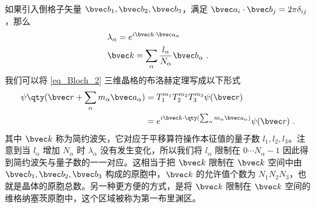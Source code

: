 如果引入倒格子矢量 $\bvec b_1,\bvec b_2,\bvec b_3$，满足 $\bvec a_i \cdot \bvec b_j = 2\pi \delta_{ij}$，那么
\begin{equation}
\begin{aligned}
&\lambda_\alpha = e^{i \bvec k \cdot \bvec a_\alpha}\\
&\bvec k=\sum_\alpha\frac{l_\alpha}{N_\alpha} \bvec b_\alpha~.
\end{aligned}
\end{equation}
我们可以将 \autoref{eq_Bloch_2} 三维晶格的布洛赫定理写成以下形式
\begin{equation}
\begin{aligned}
\psi\qty(\bvec r+\sum_\alpha m_\alpha\bvec a_\alpha) &= T_1^{m_1} T_2^{m_2} T_3^{m_3} \psi(\bvec r)\\
&=e^{i\bvec k\cdot \qty(\sum_\alpha m_\alpha\bvec a_\alpha)}\psi(\bvec r)~.
\end{aligned}
\end{equation}
其中 $\bvec k$ 称为简约波矢，它对应于平移算符操作本征值的量子数 $l_1,l_2,l_3$。注意到当 $l_\alpha$ 增加 $N_\alpha$ 时 $\lambda_\alpha$ 没有发生变化，所以我们将 $l_\alpha$ 限制在 $0\cdots N_\alpha-1$ 因此得到简约波矢与量子数的一一对应。这相当于把 $\bvec k$ 限制在 $\bvec k$ 空间中由 $\bvec b_1,\bvec b_2,\bvec b_3$ 构成的原胞中，$\bvec k$ 的允许值个数为 $N_1N_2N_3$，也就是晶体的原胞总数。另一种更方便的方式，是将 $\bvec k$ 限制在 $\bvec k$ 空间的维格纳塞茨原胞中，这个区域被称为第一布里渊区。